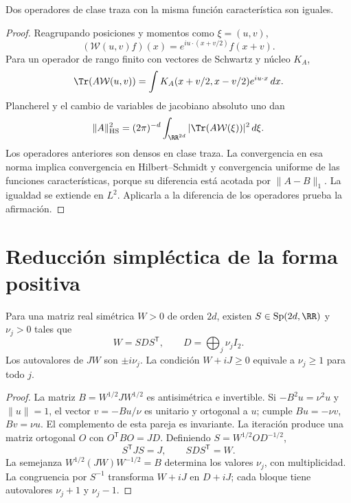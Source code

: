 \begin{lemma}
\label{x_reciprocidad:app:lem:unicidad-weyl}
Dos operadores de clase traza con la misma función característica son iguales.
\end{lemma}
\begin{proof}
Reagrupando posiciones y momentos como \(\xi=(u,v)\),
\[
 (\mathcal W(u,v)f)(x)=e^{iu\cdot(x+v/2)}f(x+v).
\]
Para un operador de rango finito con vectores de Schwartz y núcleo \(K_A\),
\[
 \Tr(A\mathcal W(u,v))=\int K_A(x+v/2,x-v/2)e^{iu\cdot x}\,dx.
\]
Plancherel y el cambio de variables de jacobiano absoluto uno dan
\[
 \|A\|_{\rm HS}^2=(2\pi)^{-d}\int_{\RR^{2d}}
 |\Tr(A\mathcal W(\xi))|^2\,d\xi.
\]
Los operadores anteriores son densos en clase traza. La convergencia
en esa norma implica convergencia en Hilbert--Schmidt y convergencia
uniforme de las funciones características, porque su diferencia está
acotada por \(\|A-B\|_1\). La igualdad se extiende en \(L^2\).
Aplicarla a la diferencia de los operadores prueba la afirmación.
\end{proof}

\section{Reducción simpléctica de la forma positiva}
\begin{theorem}
\label{x_reciprocidad:app:thm:williamson}
Para una matriz real simétrica \(W>0\) de orden \(2d\), existen
\(S\in\operatorname{Sp}(2d,\RR)\) y \(\nu_j>0\) tales que
\[
 W=SDS^{\mathsf T},\qquad D=\bigoplus_j\nu_jI_2.
\]
Los autovalores de \(JW\) son \(\pm i\nu_j\). La condición
\(W+iJ\geq0\) equivale a \(\nu_j\geq1\) para todo \(j\).
\end{theorem}
\begin{proof}
La matriz \(B=W^{1/2}JW^{1/2}\) es antisimétrica e invertible.
Si \(-B^2u=\nu^2u\) y \(\|u\|=1\), el vector
\(v=-Bu/\nu\) es unitario y ortogonal a \(u\); cumple
\(Bu=-\nu v\), \(Bv=\nu u\). El complemento de esta pareja es
invariante. La iteración produce una matriz ortogonal \(O\) con
\(O^{\mathsf T}BO=JD\). Definiendo \(S=W^{1/2}OD^{-1/2}\),
\[
 S^{\mathsf T}JS=J,\qquad SDS^{\mathsf T}=W.
\]
La semejanza \(W^{1/2}(JW)W^{-1/2}=B\) determina los valores
\(\nu_j\), con multiplicidad. La congruencia por \(S^{-1}\)
transforma \(W+iJ\) en \(D+iJ\); cada bloque tiene autovalores
\(\nu_j+1\) y \(\nu_j-1\).
\end{proof}

